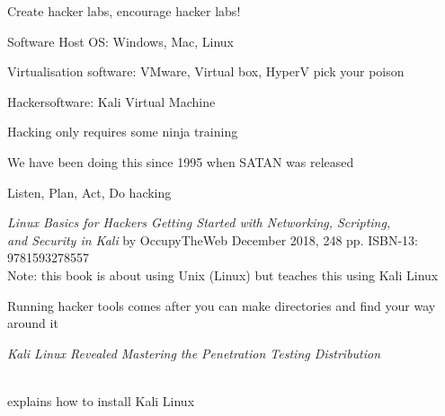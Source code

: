 \documentclass[Screen16to9,17pt]{foils}
\begin{document}

\begin{list2}
\item Create hacker labs, encourage hacker labs!
\item Software Host OS: Windows, Mac, Linux
\item Virtualisation software: VMware, Virtual box, HyperV pick your poison
\item Hackersoftware: Kali Virtual Machine 
\end{list2}



\begin{list2}
\item Hacking only requires some ninja training
\item We have been doing this since 1995 when SATAN was released
\item Listen, Plan, Act, Do hacking
\end{list2}



\emph{Linux Basics for Hackers
Getting Started with Networking, Scripting, \\
and Security in Kali} by OccupyTheWeb December 2018, 248 pp.
ISBN-13: 9781593278557\\



Note: this book is about using Unix (Linux) but teaches this using Kali Linux

Running hacker tools comes after you can make directories and find your way around it




\emph{Kali Linux Revealed  Mastering the Penetration Testing Distribution}

\\
explains how to install Kali Linux


\end{document}
